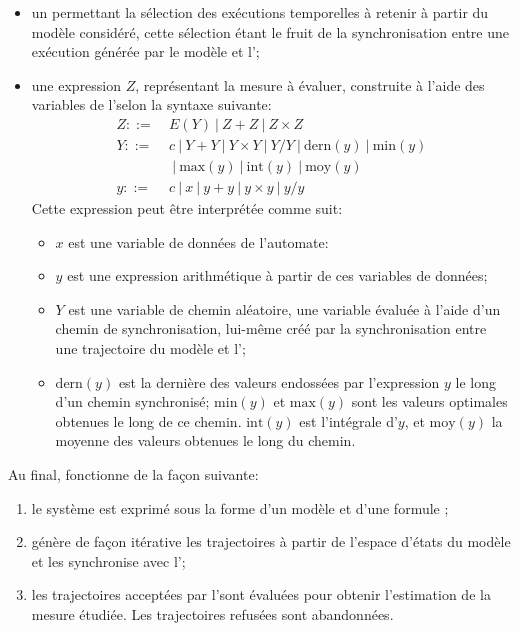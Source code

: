 \begin{itemize}
    \item un \alh permettant la sélection des exécutions temporelles à retenir à partir du modèle \rpsg considéré, cette sélection étant le fruit de la synchronisation entre une exécution générée par le modèle \rpsg et l'\alh;
    \item une expression $Z$, représentant la mesure à évaluer, construite à l'aide des variables de l'\alh selon la syntaxe suivante:
    \[
        \begin{split}
            Z ::=  & \ E(Y)\ | \ Z+Z\           | \ Z \times Z\\
            Y ::=  & \ c\    | \ Y+Y\           | \ Y \times Y\    | \ Y/Y\            | \ \mbox{dern}(y)\ | \ \mbox{min}(y)\\
                   & \ \     | \ \mbox{max}(y)\ | \ \mbox{int}(y)\ | \ \mbox{moy}(y)\\
            y ::=  & \ c\    | \ x\             | \ y+y\           | \ y \times y\     | \ y/y
        \end{split}
    \]
    Cette expression peut être interprétée comme suit:
    \begin{itemize}
        \item $x$ est une variable de données de l'automate:
        \item $y$ est une expression arithmétique à partir de ces variables de données;
        \item $Y$ est une variable de chemin aléatoire, \cad une variable évaluée à l'aide d'un chemin de synchronisation, lui-même créé par la synchronisation entre une trajectoire du modèle \rpsg et l'\alh;
        \item $\mbox{dern}(y)$ est la dernière des valeurs endossées par l'expression $y$ le long d'un chemin synchronisé; $\mbox{min}(y)$ et $\mbox{max}(y)$ sont les valeurs optimales obtenues le long de ce chemin. $\mbox{int}(y)$ est l'intégrale d'$y$, et $\mbox{moy}(y)$ la moyenne des valeurs obtenues le long du chemin.
    \end{itemize}
\end{itemize}

Au final, \lsah fonctionne de la façon suivante:
\begin{enumerate}
    \item le système est exprimé sous la forme d'un modèle \rpsg et d'une formule \lsah;
    \item \lsah génère de façon itérative les trajectoires à partir de l'espace d'états du modèle \rpsg et les synchronise avec l'\alh;
    \item les trajectoires acceptées par l'\alh sont évaluées pour obtenir l'estimation de la mesure étudiée. Les trajectoires refusées sont abandonnées.
\end{enumerate}

